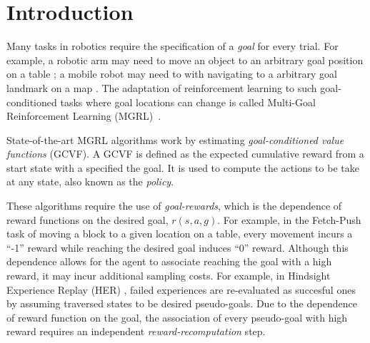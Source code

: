 \section{Introduction}

Many tasks in robotics require the specification of a \emph{goal} for every
trial. For example, a robotic arm may need to move an object to an arbitrary
goal position on a table \citep{gu2017deep}; a mobile robot may need to with
navigating to a arbitrary goal landmark on a map \citep{zhu2017target}. The
adaptation of reinforcement learning to such goal-conditioned tasks where goal
locations can change is called Multi-Goal Reinforcement Learning
(MGRL)~\citep{plappert2018multi}.

State-of-the-art MGRL algorithms
\citep{andrychowicz2017hindsight, pong2018temporal}
work by estimating \emph{goal-conditioned value functions} (GCVF). A
GCVF is defined as the expected cumulative reward from a
start state with a specified the goal. It is used to compute the
actions to be take at any state, also known as the \emph{policy}.

These algorithms require the use of \emph{goal-rewards}, which is the
dependence of reward functions on the desired goal, $r(s,a,g)$.
For example, in the Fetch-Push task \citep{plappert2018multi} of moving
a block to a given location on a table, every movement incurs a ``-1''
reward while reaching the desired goal induces ``0'' reward. Although
this dependence allows for the agent to associate reaching the goal with a high
reward, it may incur additional sampling costs. For example, in Hindsight Experience
Replay (HER) \citep{andrychowicz2017hindsight}, failed experiences are
re-evaluated as succesful ones by assuming traversed states to be
desired pseudo-goals. Due to the dependence of reward function on the goal,
the association of every pseudo-goal with high reward requires an independent
\emph{reward-recomputation} step. 


